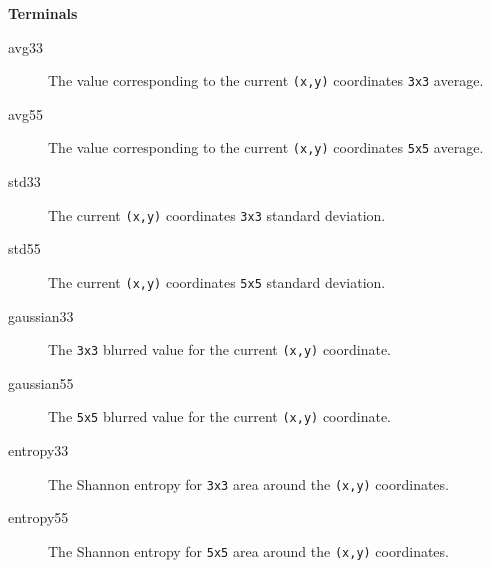\documentclass[titlepage,letterpaper]{article}
\begin{document}

\textbf{Terminals}
\begin{description}
\item [avg33] The value corresponding to the current \texttt{(x,y)} coordinates \texttt{3x3} average.
\item [avg55] The value corresponding to the current \texttt{(x,y)} coordinates \texttt{5x5} average.
\item [std33] The current \texttt{(x,y)} coordinates \texttt{3x3} standard deviation.
\item [std55] The current \texttt{(x,y)} coordinates \texttt{5x5} standard deviation.
\item [gaussian33] The \texttt{3x3} blurred value for the current \texttt{(x,y)} coordinate.
\item [gaussian55] The \texttt{5x5} blurred value for the current \texttt{(x,y)} coordinate.
\item [entropy33] The Shannon entropy for \texttt{3x3} area around the \texttt{(x,y)} coordinates.
\item [entropy55] The Shannon entropy for \texttt{5x5} area around the \texttt{(x,y)} coordinates.\\
\end{description}
\end{document}
